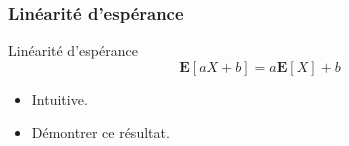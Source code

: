 \documentclass{beamer}
\begin{document}
\begin{frame}[t]
  \frametitle{Linéarité d'espérance}
 \begin{block}{Linéarité d'espérance}
  \begin{equation*}
  \mathbf{E}[aX + b] = a\mathbf{E}[X] + b
  \end{equation*} 
 \end{block} 
 \begin{itemize}
   \item Intuitive.\\[4pt]
   \item Démontrer ce résultat.
 \end{itemize}
\end{frame}
\end{document}
